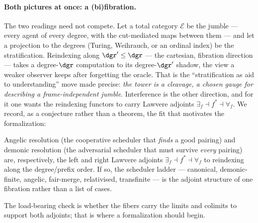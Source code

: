 \paragraph{Both pictures at once: a (bi)fibration.}
The two readings need not compete. Let a total category $\mathcal{E}$ be the
jumble --- every agent of every degree, with the cut-mediated maps between them ---
and let a projection to the degrees (Turing, Weihrauch, or an ordinal index) be
the stratification. Reindexing along $\dgr' \le \dgr$ --- the cartesian, fibration
direction --- takes a degree-$\dgr$ computation to its degree-$\dgr'$ shadow, the
view a weaker observer keeps after forgetting the oracle. That is the
``stratification as aid to understanding'' move made precise: \emph{the tower is a
cleavage, a chosen gauge for describing a frame-independent jumble}. Interference
is the other direction, and for it one wants the reindexing functors to carry
Lawvere adjoints $\exists_f \dashv f^{*} \dashv \forall_f$. We record, as a
conjecture rather than a theorem, the fit that motivates the formalization:

\begin{conjecture}\label{ndo:conj:adjoint}
Angelic resolution (the cooperative scheduler that \emph{finds} a good pairing)
and demonic resolution (the adversarial scheduler that must survive \emph{every}
pairing) are, respectively, the left and right Lawvere adjoints
$\exists_f \dashv f^{*} \dashv \forall_f$ to reindexing along the
degree/prefix order. If so, the scheduler ladder --- canonical, demonic-finite,
angelic, fair-merge, relativised, transfinite --- is the adjoint structure of one
fibration rather than a list of cases.
\end{conjecture}

\noindent
The load-bearing check is whether the fibers carry the limits and colimits to
support both adjoints; that is where a formalization should begin.

